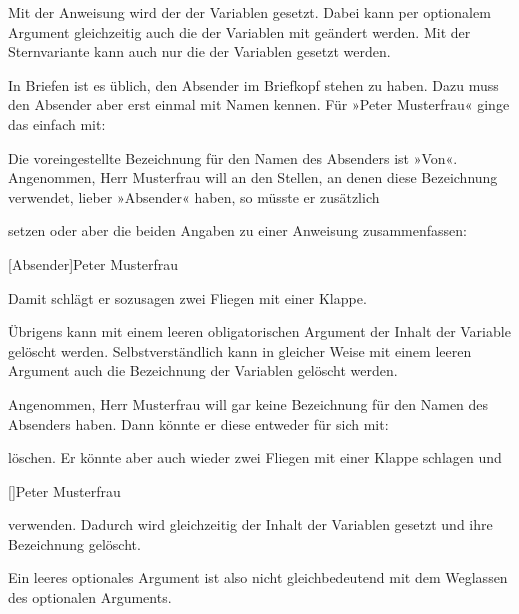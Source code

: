 \begin{Declaration}
\end{Declaration}
Mit der Anweisung  wird der  der Variablen
 gesetzt. Dabei kann per optionalem Argument gleichzeitig auch die
 der Variablen mit geändert werden. Mit der
Sternvariante  kann auch nur die  der
Variablen  gesetzt werden.
\begin{Example}
  In Briefen ist es üblich, den Absender im Briefkopf stehen zu haben. Dazu
  muss \KOMAScript{} den Absender aber erst einmal mit Namen kennen. Für
  »Peter Musterfrau« ginge das einfach mit:
\begin{lstcode}
\end{lstcode}
  Die voreingestellte Bezeichnung für den Namen des Absenders ist
  »Von«. Angenommen, Herr Musterfrau will %
  %
  an den Stellen, an denen \KOMAScript{} diese Bezeichnung verwendet, lieber
  »Absender« haben, so müsste er zusätzlich
\begin{lstcode}
\end{lstcode}
  setzen oder aber die beiden Angaben zu einer Anweisung zusammenfassen:
\begin{lstcode}
  [Absender]{Peter Musterfrau}
\end{lstcode}
  Damit schlägt er sozusagen zwei Fliegen mit einer Klappe.
\end{Example}
Übrigens kann mit einem leeren obligatorischen Argument 
der Inhalt der Variable gelöscht werden. Selbstverständlich kann in
gleicher Weise mit einem leeren Argument  auch die
Bezeichnung der Variablen gelöscht werden.
\begin{Example}
  Angenommen, Herr Musterfrau will gar keine Bezeichnung für den Namen des
  Absenders haben. Dann könnte er diese entweder für sich mit:
\begin{lstcode}
\end{lstcode}
  löschen. Er könnte aber auch wieder zwei Fliegen mit einer Klappe
  schlagen und
\begin{lstcode}
  []{Peter Musterfrau}
\end{lstcode}
  verwenden. Dadurch wird gleichzeitig der Inhalt der Variablen gesetzt und
  ihre Bezeichnung gelöscht.%
\end{Example}%
\iftrue%
Ein leeres optionales Argument ist also nicht
gleichbedeutend mit dem Weglassen des optionalen Arguments.%
\else %
\vskip -1\ht\strutbox plus .75\strutbox%
\fi%
\EndIndexGroup

